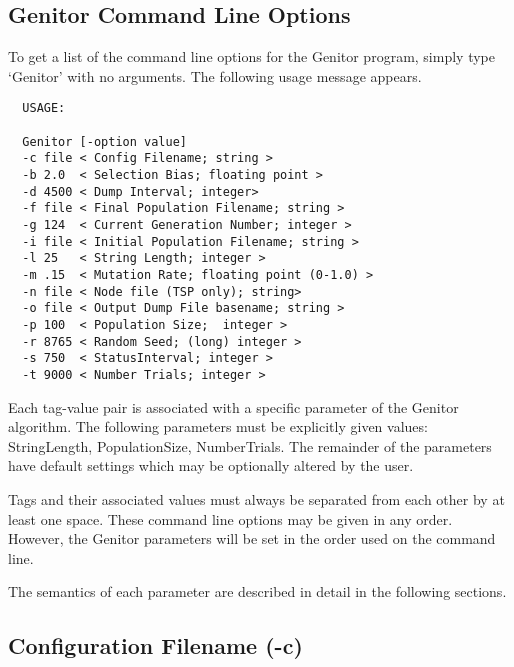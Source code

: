 
\setlength{\textwidth}{7.25in}
\setlength{\textheight}{9.25in}
\setlength{\oddsidemargin}{-.2in}
\setlength{\evensidemargin}{-.2in}
\setlength{\topmargin}{-.5in}



\begin{center}
\section*{Genitor Command Line Options}
\end{center}

To get a list of the command line options for the Genitor program,
simply type `Genitor' with no arguments.  The following usage message
appears.

\begin{verbatim}
  USAGE:

  Genitor [-option value]
  -c file < Config Filename; string >
  -b 2.0  < Selection Bias; floating point >
  -d 4500 < Dump Interval; integer>
  -f file < Final Population Filename; string >
  -g 124  < Current Generation Number; integer >
  -i file < Initial Population Filename; string >
  -l 25   < String Length; integer >
  -m .15  < Mutation Rate; floating point (0-1.0) >
  -n file < Node file (TSP only); string>
  -o file < Output Dump File basename; string >
  -p 100  < Population Size;  integer >
  -r 8765 < Random Seed; (long) integer >
  -s 750  < StatusInterval; integer >
  -t 9000 < Number Trials; integer >
\end{verbatim}

Each tag-value pair is associated with a specific parameter of the Genitor
algorithm.  The following parameters must be explicitly given values: StringLength,
PopulationSize, NumberTrials.  The remainder of the parameters have default
settings which may be optionally altered by the user.

Tags and their associated values must always be separated from each other by 
at least one space.  These command line options may be given in any order.
However, the Genitor parameters will be set in the order used on the command line.  

The semantics of each parameter are described in detail in the following sections.


\subsection*{Configuration Filename (-c)}


